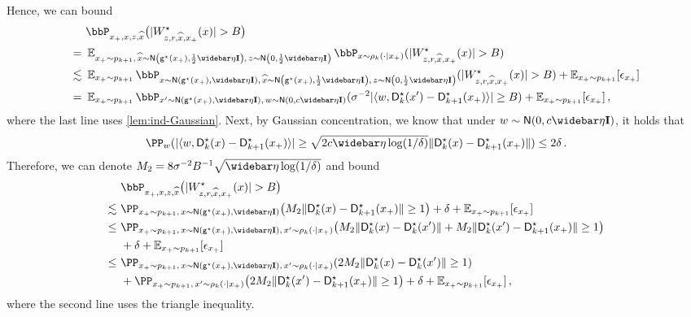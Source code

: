 Hence, we can bound
\begin{align*}
    &~ \bbP_{x_+,x,z,\xhat}\prn[\big]{\abs{\Wstar_{z,r,\xhat,x_+}(x)}>\B} \\
    =&~ \En_{x_+\sim p_{k+1},\,\xhat\sim \normal{\gds(x_+),\frac12\etabar\Id},\, z\sim \normal{0,\frac12\etabar\Id}} \bbP_{x\sim \rho_k(\cdot\mid x_+)}(\abs{\Wstar_{z,r,\xhat,x_+}(x)}>\B) \\
    \leqsim&~  \En_{x_+\sim p_{k+1}} \bbP_{x\sim \normal{\gds(x_+), \etabar\Id}, \,\xhat\sim \normal{\gds(x_+),\frac12\etabar\Id},\, z\sim \normal{0,\frac12\etabar\Id}}(\abs{\Wstar_{z,r,\xhat,x_+}(x)}>\B)+\En_{x_+\sim p_{k+1}}[\eps_{x_+}] \\
    =&~\En_{x_+\sim p_{k+1}} \bbP_{x'\sim \normal{\gds(x_+), \etabar\Id},\, w\sim \normal{0,c\etabar\Id}}(\sigma^{-2}\abs{\tri{w,\Ds_k(x')-\Ds_{k+1}(x_+)}}\geq \B)+\En_{x_+\sim p_{k+1}}[\eps_{x_+}]\,,
\end{align*}
where the last line uses \cref{lem:ind-Gaussian}. Next, by Gaussian concentration, we know that under $w\sim \normal{0,c\etabar\Id}$, it holds that 
\begin{align*}
    \PP_w(\abs{\tri{w,\Ds_k(x)-\Ds_{k+1}(x_+)}}\geq \sqrt{2c\etabar\log(1/\delta)}\nrm{\Ds_k(x)-\Ds_{k+1}(x_+)})\leq 2\delta\,.
\end{align*}
Therefore, we can denote $M_2=8\sigma^{-2}B^{-1}\sqrt{\etabar\log(1/\delta)}$ and bound
\begin{align*}
    &~ \bbP_{x_+,x,z,\xhat}\prn[\big]{\abs{\Wstar_{z,r,\xhat,x_+}(x)}>\B} \\
    \leqsim &~ \PP_{x_+\sim p_{k+1},\, x\sim \normal{\gds(x_+), \etabar\Id}}\prn*{M_2\nrm{\Ds_k(x)-\Ds_{k+1}(x_+)}\geq 1}+\delta+\En_{x_+\sim p_{k+1}}[\eps_{x_+}] \\
    \leq&~ \PP_{x_+\sim p_{k+1},\, x\sim \normal{\gds(x_+), \etabar\Id},\, x'\sim \rho_k(\cdot\mid x_+)}\prn*{M_2\nrm{\Ds_k(x)-\Ds_k(x')}+M_2\nrm{\Ds_k(x')-\Ds_{k+1}(x_+)}\geq 1}\\
    &~+\delta+\En_{x_+\sim p_{k+1}}[\eps_{x_+}] \\
    \leq&~ \PP_{x_+\sim p_{k+1},\, x\sim \normal{\gds(x_+), \etabar\Id},\, x'\sim \rho_k(\cdot\mid x_+)}\prn*{2M_2\nrm{\Ds_k(x)-\Ds_k(x')}\geq 1} \\
    &~+\PP_{x_+\sim p_{k+1},\, x'\sim \rho_k(\cdot\mid x_+)}\prn*{2M_2\nrm{\Ds_k(x')-\Ds_{k+1}(x_+)}\geq 1}+\delta+\En_{x_+\sim p_{k+1}}[\eps_{x_+}]\,,
\end{align*}
where the second line uses the triangle inequality. 

